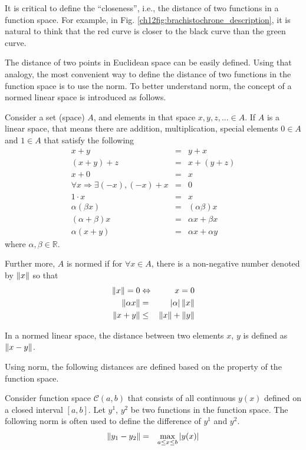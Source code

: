 It is critical to define the ``closeness'', i.e., the distance of two functions in a function space. For example, in Fig. \ref{ch12fig:brachistochrone_description}, it is natural to think that the red curve is closer to the black curve than the green curve. 

The distance of two points in Euclidean space can be easily defined. Using that analogy, the most convenient way to define the distance of two functions in the function space is to use the norm. To better understand norm, the concept of a normed linear space is introduced as follows.

Consider a set (space) $A$, and elements in that space $x, y, z, ... \in A$. If $A$ is a linear space, that means there are addition, multiplication, special elements $0\in A$ and $1\in A$ that satisfy the following
\begin{eqnarray}
	x + y &=& y + x \nonumber \\
	(x + y) + z &=& x + (y + z) \nonumber \\
	x + 0 &=& x \nonumber \\
	\forall x \Rightarrow \exists (-x), (-x) + x &=& 0 \nonumber \\
	1 \cdot x &=& x \nonumber \\
	\alpha(\beta x) &=& (\alpha\beta)x \nonumber \\
	(\alpha + \beta)x &=& \alpha x + \beta x \nonumber \\
	\alpha(x+y) &=& \alpha x + \alpha y \nonumber
\end{eqnarray}
where $\alpha, \beta \in \mathbb{R}$.

Further more, $A$ is normed if for $\forall x \in A$, there is a non-negative number denoted by $\left\lVert x\right\rVert$ so that
\begin{eqnarray}
	\left\lVert x\right\rVert = 0 &\Leftrightarrow& x = 0 \nonumber \\
	\left\lVert\alpha x\right\rVert &=& |\alpha| \left\lVert x\right\rVert \nonumber \\
	\left\lVert x + y\right\rVert &\leq& \left\lVert x\right\rVert + \left\lVert y\right\rVert \nonumber
\end{eqnarray}

In a normed linear space, the distance between two elements $x$, $y$ is defined as $\left\lVert x-y\right\rVert$.

Using norm, the following distances are defined based on the property of the function space.

Consider function space $\mathcal{C}(a,b)$ that consists of all continuous $y(x)$ defined on a closed interval $[a,b]$. Let $y^1$, $y^2$ be two functions in the function space. The following norm is often used to define the difference of $y^1$ and $y^2$.
\begin{eqnarray}
  \left\lVert y_1 - y_2\right\rVert &=& \max_{a\leq x \leq b} |y(x)| \label{eq:functionspacenorm0}
\end{eqnarray}

